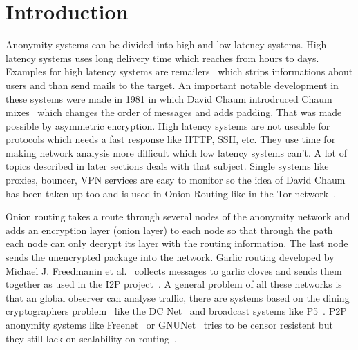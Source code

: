 \documentclass{sig-alternate}
\begin{document}



\section{Introduction}
Anonymity systems can be divided into high and low latency systems. High latency systems uses long delivery time which reaches from hours to days. Examples for high latency systems are remailers~\cite{linkOne, linkTwo, linkThree, linkFour} which strips informations about users and than send mails to the target. An important notable development in these systems were made in 1981 in which David Chaum introdruced Chaum mixes~\cite{chaum1981untraceable} which changes the order of messages and adds padding. That was made possible by asymmetric encryption. High latency systems are not useable for protocols which needs a fast response like HTTP, SSH, etc. They use time for making network analysis more difficult which low latency systems can't. A lot of topics described in later sections deals with that subject. Single systems like proxies, bouncer, VPN services are easy to monitor so the idea of David Chaum has been taken up too and is used in Onion Routing like in the Tor network~\cite{dingledine2004tor}.

Onion routing takes a route through several nodes of the anonymity network and adds an encryption layer (onion layer) to each node so that through the path each node can only decrypt its layer with the routing information. The last node sends the unencrypted package into the network. Garlic routing developed by Michael J. Freedmanin et al.~\cite{dingledine2000free} collects messages to garlic cloves and sends them together as used in the I2P project~\cite{linkFive}.
A general problem of all these networks is that an global observer can analyse traffic, there are systems based on the dining cryptographers problem~\cite{dijkstra2009ew}
like the DC Net~\cite{chaum1988dining} and broadcast systems like P5~\cite{linkSix}. P2P anonymity systems like Freenet~\cite{linkSeven} or GNUNet~\cite{linkEight, linkNine}  tries to be censor resistent but they still lack on scalability on routing~\cite{clarke2010private}.
\end{document}
